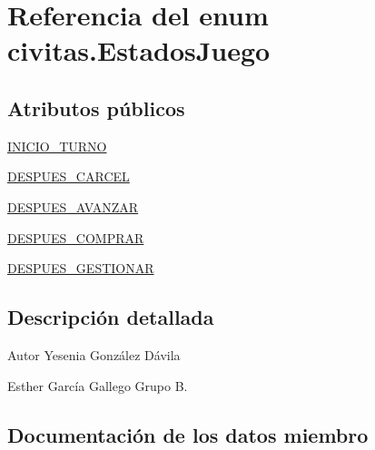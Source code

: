 \hypertarget{enumcivitas_1_1EstadosJuego}{}\section{Referencia del enum civitas.\+Estados\+Juego}
\label{enumcivitas_1_1EstadosJuego}
\subsection*{Atributos públicos}
\begin{DoxyCompactItemize}
\item 
\hyperlink{enumcivitas_1_1EstadosJuego_a89f1dcbba3f71733636da0766dc7275b}{I\+N\+I\+C\+I\+O\+\_\+\+T\+U\+R\+NO}
\item 
\hyperlink{enumcivitas_1_1EstadosJuego_a59c569bc480529acb32fdfc4de10ed5c}{D\+E\+S\+P\+U\+E\+S\+\_\+\+C\+A\+R\+C\+EL}
\item 
\hyperlink{enumcivitas_1_1EstadosJuego_ad28e1ef6506cf6ad78ab8c74fe141496}{D\+E\+S\+P\+U\+E\+S\+\_\+\+A\+V\+A\+N\+Z\+AR}
\item 
\hyperlink{enumcivitas_1_1EstadosJuego_a191483944ef2064f4cda841256b5e16d}{D\+E\+S\+P\+U\+E\+S\+\_\+\+C\+O\+M\+P\+R\+AR}
\item 
\hyperlink{enumcivitas_1_1EstadosJuego_acfd797050d6b20764a7a04ef4f6bec6a}{D\+E\+S\+P\+U\+E\+S\+\_\+\+G\+E\+S\+T\+I\+O\+N\+AR}
\end{DoxyCompactItemize}


\subsection{Descripción detallada}
\begin{DoxyAuthor}{Autor}
Yesenia González Dávila 

Esther García Gallego Grupo B. 
\end{DoxyAuthor}


\subsection{Documentación de los datos miembro}
\mbox{\label{enumcivitas_1_1EstadosJuego_ad28e1ef6506cf6ad78ab8c74fe141496}} 
